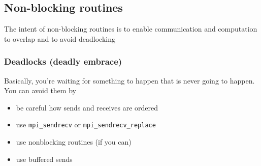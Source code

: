 \documentclass[10pt]{article}
\newenvironment{mitemize}
{
  \begin{itemize}
  \setlength{\itemsep}{1pt}
  \setlength{\parskip}{0pt}
  \setlength{\parsep}{0pt}}{\end{itemize}
}
\begin{document}
\subsection{Non-blocking routines}
The intent of non-blocking routines is to enable communication and computation to overlap and to avoid deadlocking

\subsubsection{Deadlocks (deadly embrace)}
Basically, you're waiting for something to happen that is never going to happen. You can avoid them by
\begin{mitemize}
  \item be careful how sends and receives are ordered
  \item use \texttt{mpi\_sendrecv} or \texttt{mpi\_sendrecv\_replace}
  \item use nonblocking routines (if you can)
  \item use buffered sends
\end{mitemize}
\end{document}
